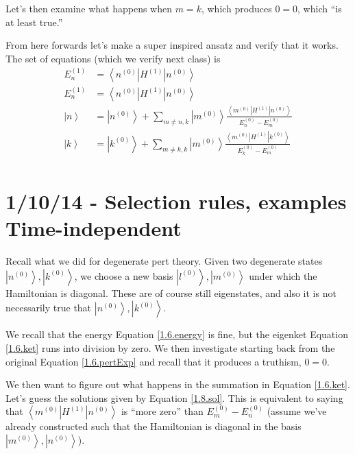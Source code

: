 \documentclass[10pt]{report}
\newcommand{\bra}[1]{\left<#1\right|}
\newcommand{\ket}[1]{\left|#1\right>}
\begin{document}
Let's then examine what happens when $m=k$, which produces $0=0$, which ``is at least true.''

From here forwards let's make a super inspired ansatz and verify that it works. The set of equations (which we verify next class) is
\begin{align}
    E_n^{(1)} &= \bra{n^{(0)}}H^{(1)}\ket{n^{(0)}}\\
    E_n^{(1)} &= \bra{n^{(0)}}H^{(1)}\ket{n^{(0)}}\\
    \ket{n} &= \ket{n^{(0)}} + \sum_{m\neq n,k}\ket{m^{(0)}}\frac{\bra{m^{(0)}}H^{(1)}\ket{n^{(0)}}}{E_n^{(0)} - E_m^{(0)}}\\
    \ket{k} &= \ket{k^{(0)}} + \sum_{m\neq k,k}\ket{m^{(0)}}\frac{\bra{m^{(0)}}H^{(1)}\ket{k^{(0)}}}{E_k^{(0)} - E_m^{(0)}}\\
    \label{1.8.sol}
\end{align}

\chapter{1/10/14 - Selection rules, examples Time-independent}

Recall what we did for degenerate pert theory. Given two degenerate states $\ket{n^{(0)}}, \ket{k^{(0)}}$, we choose a new basis $\ket{l^{(0)}}, \ket{m^{(0)}}$ under which the Hamiltonian is diagonal. These are of course still eigenstates, and also it is not necessarily true that $\ket{n^{(0)}}, \ket{k^{(0)}}$.

We recall that the energy Equation \ref{1.6.energy} is fine, but the eigenket Equation \ref{1.6.ket} runs into division by zero. We then investigate starting back from the original Equation \ref{1.6.pertExp} and recall that it produces a truthism, $0=0$.

We then want to figure out what happens in the summation in Equation \ref{1.6.ket}. Let's guess the solutions given by Equation \ref{1.8.sol}. This is equivalent to saying that $\bra{m^{(0)}}H^{(1)}\ket{n^{(0)}}$ is ``more zero'' than $E_m^{(0)} - E_n^{(0)}$ (assume we've already constructed such that the Hamiltonian is diagonal in the basis $\ket{m^{(0)}}, \ket{n^{(0)}}$).
\end{document}
